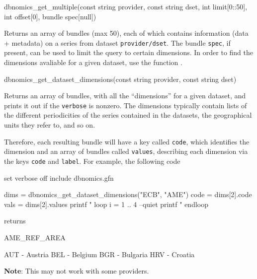 \documentclass{article}
\begin{document}
\begin{funcdoc}{dbnomics\_get\_multiple(const string provider,
    const string dset,
    int limit[0::50], \\
    int offset[0],
    bundle spec[null])}
  
  Returns an array of bundles (max 50), each of which contains
  information (data + metadata) on a series from dataset
  \texttt{provider/dset}. The bundle \texttt{spec}, if present, can be
  used to limit the query to certain dimensions. In order to find the
  dimensions avaliable for a given dataset, use the function
  .
  
  
\end{funcdoc}

\begin{funcdoc}{dbnomics\_get\_dataset\_dimensions(const string provider,
    const string dset)}

Returns an array of bundles, with all the ``dimensions'' for a given
dataset, and prints it out if the \texttt{verbose} is nonzero. The
dimensions typically contain lists of the different periodicities of
the series contained in the datasets, the geographical units they
refer to, and so on.

Therefore, each resulting bundle will have a key called \texttt{code},
which identifies the dimension and an array of bundles called
\texttt{values}, describing each dimension via the keys \texttt{code}
and \texttt{label}. For example, the following code
\begin{code}
set verbose off
include dbnomics.gfn

dims = dbnomics_get_dataset_dimensions("ECB", "AME")
code = dims[2].code
vals = dims[2].values
printf "%
loop i = 1 .. 4 --quiet
    printf "%
endloop
\end{code}

returns

\begin{code}
AME_REF_AREA

AUT - Austria
BEL - Belgium
BGR - Bulgaria
HRV - Croatia
\end{code}

\textbf{Note}: This may not work with some providers.

\end{funcdoc}
\end{document}
